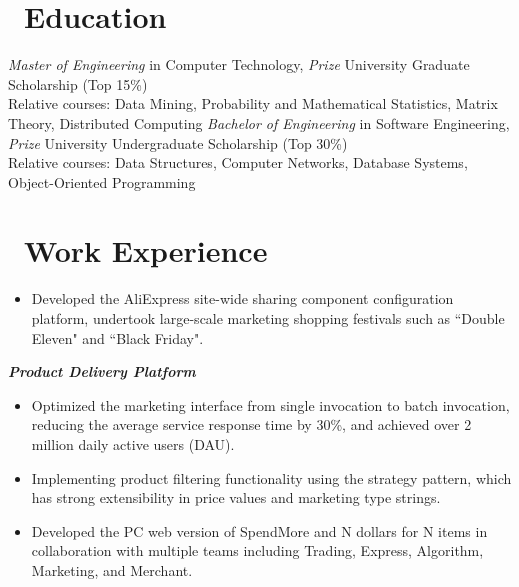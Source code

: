 \documentclass{resume}
\begin{document}

\vspace{2ex}
 \vspace{0ex}
 
\section{\faGraduationCap\ Education}
\textit{Master of Engineering} in Computer Technology, \textit{ Prize} University Graduate Scholarship (Top 15\%)
\\ Relative courses: Data Mining, Probability and Mathematical Statistics, Matrix Theory, Distributed Computing
\textit{Bachelor of Engineering} in Software Engineering, \textit{ Prize} University Undergraduate Scholarship (Top 30\%)
\\ Relative courses: Data Structures, Computer Networks, Database Systems, Object-Oriented Programming

\section{\faUsers\ Work Experience}

\begin{itemize}
  \item Developed the AliExpress site-wide sharing component configuration platform, undertook large-scale marketing shopping festivals such as ``Double Eleven" and ``Black Friday".
\end{itemize}

\setlength{\parindent}{1em}
\textit{\textbf{Product Delivery Platform }}
\begin{itemize}
  \item Optimized the marketing interface from single invocation to batch invocation, reducing the average service response time by 30\%, and  achieved over 2 million daily active users (DAU).
    \item Implementing product filtering functionality using the strategy pattern, which has strong extensibility in price values and marketing type strings.
    \item Developed the PC web version of SpendMore and N dollars for N items in collaboration with multiple teams including Trading, Express, Algorithm, Marketing, and Merchant.

\end{itemize}
\end{document}
